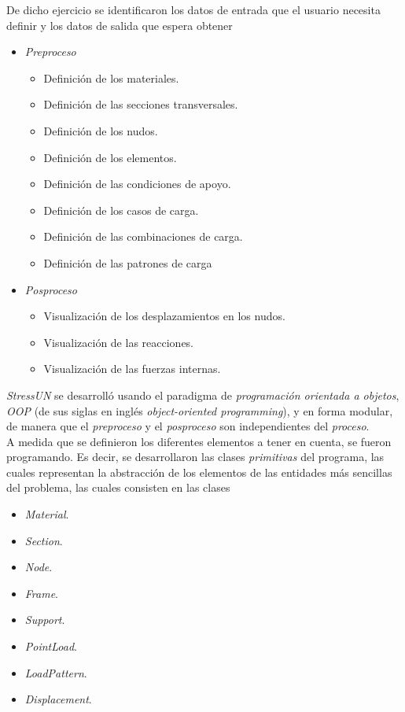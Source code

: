 De dicho ejercicio se identificaron los datos de entrada que el usuario necesita definir y los datos de salida que espera obtener
\begin{itemize}
    \item \textit{Preproceso}
    \begin{itemize}
        \item Definición de los materiales.
        \item Definición de las secciones transversales.
        \item Definición de los nudos.
        \item Definición de los elementos.
        \item Definición de las condiciones de apoyo.
        \item Definición de los casos de carga.
        \item Definición de las combinaciones de carga.
        \item Definición de las patrones de carga
    \end{itemize}
    \item \textit{Posproceso}
    \begin{itemize}
        \item Visualización de los desplazamientos en los nudos.
        \item Visualización de las reacciones.
        \item Visualización de las fuerzas internas.
    \end{itemize}
    
\end{itemize}

 \textit{StressUN} se desarrolló usando el paradigma de \textit{programación orientada a objetos}, \textit{OOP} (de sus siglas en inglés \textit{object-oriented programming}), y en forma modular, de manera que el \textit{preproceso} y el \textit{posproceso} son independientes del \textit{proceso}.\\

A medida que se definieron los diferentes elementos a tener en cuenta, se fueron programando. Es decir, se desarrollaron las clases \textit{primitivas} del programa, las cuales representan la abstracción de los elementos de las entidades más sencillas del problema, las cuales consisten en las clases
\begin{itemize}
    \item \textit{Material}.
    \item \textit{Section}.
    \item \textit{Node}.
    \item \textit{Frame}.
    \item \textit{Support}.
    \item \textit{PointLoad}.
    \item \textit{LoadPattern}.
    \item \textit{Displacement}.
\end{itemize}

